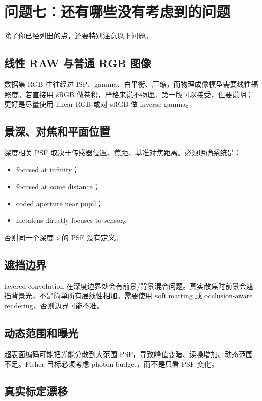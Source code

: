 \documentclass[11pt,a4paper,fontset=none]{ctexart}
\begin{document}
\section{问题七：还有哪些没有考虑到的问题}

除了你已经列出的点，还要特别注意以下问题。

\subsection{线性 RAW 与普通 RGB 图像}

数据集 RGB 往往经过 ISP、gamma、白平衡、压缩，而物理成像模型需要线性辐照度。若直接用 sRGB 做卷积，严格来说不物理。第一版可以接受，但要说明；更好是尽量使用 linear RGB 或对 sRGB 做 inverse gamma。

\subsection{景深、对焦和平面位置}

深度相关 PSF 取决于传感器位置、焦距、基准对焦距离。必须明确系统是：
\begin{itemize}
  \item focused at infinity；
  \item focused at some distance；
  \item coded aperture near pupil；
  \item metalens directly focuses to sensor。
\end{itemize}
否则同一个深度 $z$ 的 PSF 没有定义。

\subsection{遮挡边界}

layered convolution 在深度边界处会有前景/背景混合问题。真实散焦时前景会遮挡背景光，不是简单所有层线性相加。需要使用 soft matting 或 occlusion-aware rendering，否则边界可能不准。

\subsection{动态范围和曝光}

超表面编码可能把光能分散到大范围 PSF，导致峰值变暗、读噪增加、动态范围不足。Fisher 目标必须考虑 photon budget，而不是只看 PSF 变化。

\subsection{真实标定漂移}
\end{document}
